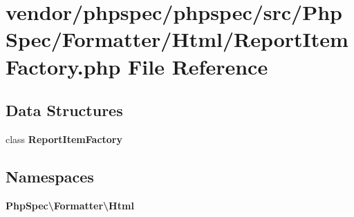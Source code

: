 \section{vendor/phpspec/phpspec/src/\+Php\+Spec/\+Formatter/\+Html/\+Report\+Item\+Factory.php File Reference}
\label{_report_item_factory_8php}
\subsection*{Data Structures}
\begin{DoxyCompactItemize}
\item 
class {\bf Report\+Item\+Factory}
\end{DoxyCompactItemize}
\subsection*{Namespaces}
\begin{DoxyCompactItemize}
\item 
 {\bf Php\+Spec\textbackslash{}\+Formatter\textbackslash{}\+Html}
\end{DoxyCompactItemize}
